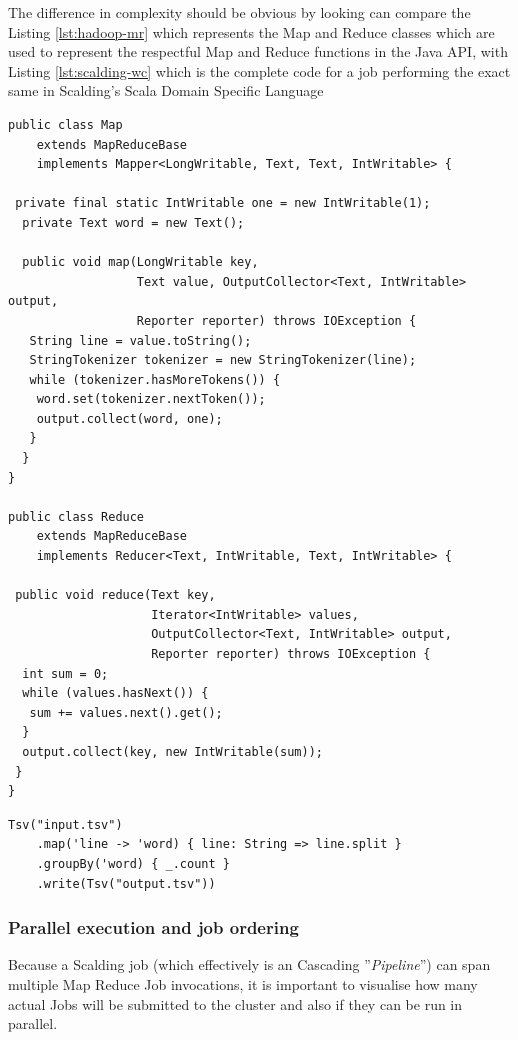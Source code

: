 The difference in complexity should be obvious by looking  can compare the Listing \ref{lst:hadoop-mr} which represents the Map and Reduce classes which are used to represent the respectful Map and Reduce functions in the Java API, with Listing \ref{lst:scalding-wc} which is the complete code for a job performing the exact same in Scalding's Scala Domain Specific Language



\begin{lstlisting}[caption={Word Count example Job, implemented using plain Java Map Reduce API}, label={lst:hadoop-mr}]
public class Map 
    extends MapReduceBase 
    implements Mapper<LongWritable, Text, Text, IntWritable> {

 private final static IntWritable one = new IntWritable(1);
  private Text word = new Text();

  public void map(LongWritable key, 
                  Text value, OutputCollector<Text, IntWritable> output, 
                  Reporter reporter) throws IOException {
   String line = value.toString();
   StringTokenizer tokenizer = new StringTokenizer(line);
   while (tokenizer.hasMoreTokens()) {
    word.set(tokenizer.nextToken());
    output.collect(word, one);
   }
  }
}

public class Reduce 
    extends MapReduceBase 
    implements Reducer<Text, IntWritable, Text, IntWritable> {

 public void reduce(Text key, 
                    Iterator<IntWritable> values, 
                    OutputCollector<Text, IntWritable> output, 
                    Reporter reporter) throws IOException {
  int sum = 0;
  while (values.hasNext()) {
   sum += values.next().get();
  }
  output.collect(key, new IntWritable(sum));
 }
}
\end{lstlisting}


\begin{lstlisting}[caption={Simplest Scalding job used in Oculus -- each frame perceptual hashing}, label={lst:simplest-scalding-job}]
  Tsv("input.tsv")
    .map('line -> 'word) { line: String => line.split }
    .groupBy('word) { _.count }
    .write(Tsv("output.tsv"))
\end{lstlisting}


\subsubsection{Parallel execution and job ordering}
Because a Scalding job (which effectively is an Cascading ''\textit{Pipeline}'') can span multiple Map Reduce Job invocations,
it is important to visualise how many actual Jobs will be submitted to the cluster and also if they can be run in parallel.

